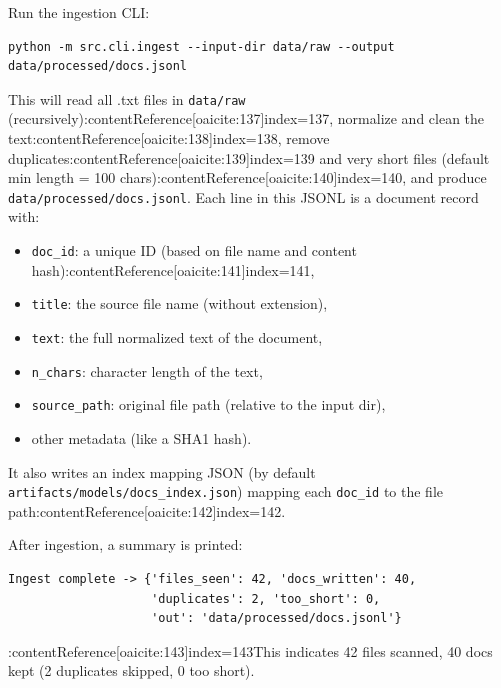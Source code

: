 \documentclass{article}
\begin{document}
Run the ingestion CLI:
\begin{verbatim}
python -m src.cli.ingest --input-dir data/raw --output data/processed/docs.jsonl
\end{verbatim}
This will read all .txt files in \texttt{data/raw} (recursively):contentReference[oaicite:137]{index=137}, normalize and clean the text:contentReference[oaicite:138]{index=138}, remove duplicates:contentReference[oaicite:139]{index=139} and very short files (default min length = 100 chars):contentReference[oaicite:140]{index=140}, and produce \texttt{data/processed/docs.jsonl}. Each line in this JSONL is a document record with:
\begin{itemize}
    \item \texttt{doc\_id}: a unique ID (based on file name and content hash):contentReference[oaicite:141]{index=141},
    \item \texttt{title}: the source file name (without extension),
    \item \texttt{text}: the full normalized text of the document,
    \item \texttt{n\_chars}: character length of the text,
    \item \texttt{source\_path}: original file path (relative to the input dir),
    \item other metadata (like a SHA1 hash).
\end{itemize}
It also writes an index mapping JSON (by default \texttt{artifacts/models/docs\_index.json}) mapping each \texttt{doc\_id} to the file path:contentReference[oaicite:142]{index=142}.

After ingestion, a summary is printed:
\begin{verbatim}
Ingest complete -> {'files_seen': 42, 'docs_written': 40,
                    'duplicates': 2, 'too_short': 0,
                    'out': 'data/processed/docs.jsonl'}
\end{verbatim}
:contentReference[oaicite:143]{index=143}This indicates 42 files scanned, 40 docs kept (2 duplicates skipped, 0 too short).
\end{document}
